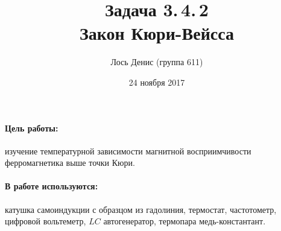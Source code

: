 \documentclass[12pt]{article}
\title{{\bf Задача 3.\,4.\,2 \\ Закон Кюри-Вейсса}}
\author{Лось Денис (группа 611)}
\date{24 ноября 2017}
\begin{document}
\maketitle

\paragraph{Цель работы: } изучение температурной зависимости магнитной восприимчивости ферромагнетика выше точки Кюри.

\paragraph{В работе используются: } катушка самоиндукции с образцом из гадолиния, термостат, 	частотометр, цифровой вольтеметр, $LC$ автогенератор, термопара медь-константант.
\end{document}
